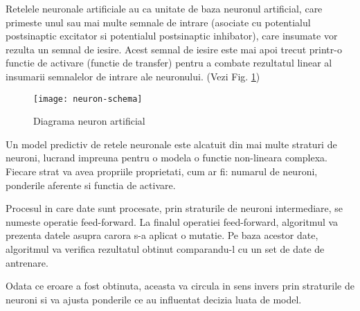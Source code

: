 	
	Retelele neuronale artificiale au ca unitate de baza neuronul artificial, care primeste unul sau mai multe semnale de intrare (asociate cu potentialul postsinaptic excitator si potentialul postsinaptic inhibator), care insumate vor rezulta un semnal de iesire. Acest semnal de iesire este mai apoi trecut printr-o functie de activare (functie de transfer) pentru a combate rezultatul linear al insumarii semnalelor de intrare ale neuronului. (Vezi Fig. \ref{fig:neuron-schema})
	
	\begin{figure}[H]
		\texttt{[image: neuron-schema]}  
		\caption{\label{fig:neuron-schema} Diagrama neuron artificial 
		\protect 
		\cite{ann}}
	\end{figure}
	
	
	Un model predictiv de retele neuronale este alcatuit din mai multe straturi de neuroni, lucrand impreuna pentru o modela o functie non-lineara complexa.
	Fiecare strat va avea propriile proprietati, cum ar fi: numarul de neuroni, ponderile aferente si functia de activare.
	
	Procesul in care date sunt procesate, prin straturile de neuroni intermediare, se numeste operatie feed-forward. La finalul operatiei feed-forward, algoritmul va prezenta datele asupra carora s-a aplicat o mutatie. Pe baza acestor date, algoritmul va verifica rezultatul obtinut comparandu-l cu un set de date de antrenare. 
	
	Odata ce eroare a fost obtinuta, aceasta va circula in sens invers prin straturile de neuroni si va ajusta ponderile ce au influentat decizia luata de model.
	
	

